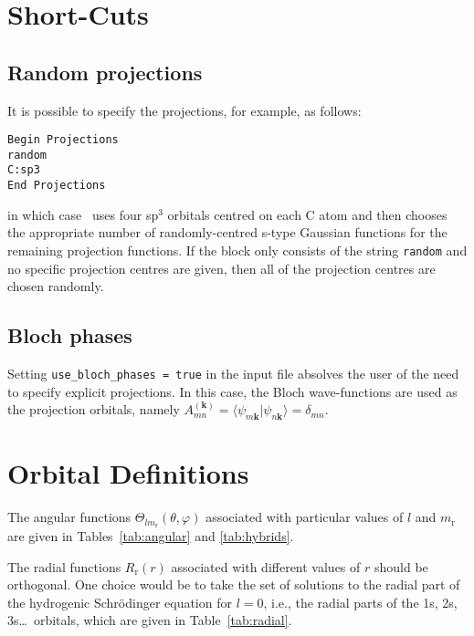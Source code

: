 \section{Short-Cuts}

\subsection{Random projections}

It is possible to specify the projections, for example, as follows:

\noindent
\verb#Begin Projections#\\
\verb#random#\\
\verb#C:sp3#\\
\verb#End Projections#

in which case \wannier\ uses four sp$^3$ orbitals centred on each C
atom and then chooses the appropriate number of randomly-centred
s-type Gaussian functions for the remaining projection functions. If
the block only consists of the string {\tt random} and no specific
projection centres are given, then all of the projection centres are
chosen randomly.


\subsection{Bloch phases}

Setting \verb#use_bloch_phases = true# in the input file absolves the
user of the need to specify explicit projections. In this case, the
Bloch wave-functions are used as the projection orbitals, namely
$A_{mn}^{(\mathbf{k})} =
\langle\psi_{m\mathbf{k}}|\psi_{n\mathbf{k}}\rangle = \delta_{mn}$.


\section{Orbital Definitions} \label{sec:orbital-defs}

The angular functions $\Theta_{lm_{\mathrm{r}}}(\theta,\varphi)$
associated with particular values of $l$ and $m_{\mathrm{r}}$ are given
in Tables~\ref{tab:angular} and \ref{tab:hybrids}.

The radial functions $R_{\mathrm{r}}(r)$ associated with different values of
$r$ should be orthogonal. One choice would be to take the set of
solutions to the radial part of the hydrogenic Schr\"{o}dinger
equation for $l=0$, i.e., the radial parts of the 1s,
2s, 3s\ldots\ orbitals, which are given in Table~\ref{tab:radial}.


